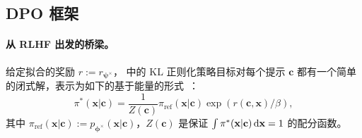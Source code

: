 






\subsection{DPO 框架}\label{subsec:dpo}
\paragraph{从 RLHF 出发的桥梁。}
给定拟合的奖励 $r := r_{\bm\psi^\times}$， 中的 KL 正则化策略目标对每个提示 $\mathbf c$ 都有一个简单的闭式解，表示为如下的基于能量的形式~\citep{peters2010relative}：
\begin{equation}\label{eq:rlhf-closed-form}
\pi^*(\mathbf x|\mathbf c)
=
\frac{1}{Z(\mathbf c)} \pi_{\mathrm{ref}}(\mathbf x|\mathbf c)\exp(r(\mathbf c,\mathbf x)/\beta),
\end{equation}
其中 $\pi_{\mathrm{ref}}(\mathbf x|\mathbf c):=p_{\bm{\phi}^\times}(\mathbf x|\mathbf c)$，$Z(\mathbf c)$ 是保证 $\int \pi^*(\mathbf x|\mathbf c) \mathop{}\!\mathrm{d} \mathbf x=1$ 的配分函数。

